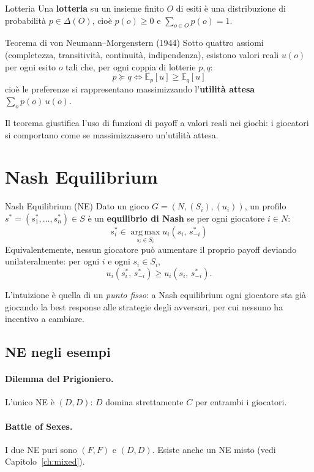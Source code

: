 \documentclass[12pt,a4paper,twoside]{book}
\theoremstyle{plain}
\theoremstyle{definition}
\newcommand{\argmax}{\operatorname*{arg\,max}}
\begin{document}
\begin{defbox}{Lotteria}
Una \textbf{lotteria} su un insieme finito $O$ di esiti è una distribuzione di probabilità $p\in\Delta(O)$, cioè $p(o)\ge 0$ e $\sum_{o\in O}p(o)=1$.
\end{defbox}

\begin{thmbox}{Teorema di von Neumann--Morgenstern (1944)}
Sotto quattro assiomi (completezza, transitività, continuità, indipendenza), esistono valori reali $u(o)$ per ogni esito $o$ tali che, per ogni coppia di lotterie $p,q$:
\[
  p \succcurlyeq q \iff \mathbb{E}_p[u] \ge \mathbb{E}_q[u]
\]
cioè le preferenze si rappresentano massimizzando l'\textbf{utilità attesa} $\sum_o p(o)\,u(o)$.
\end{thmbox}

Il teorema giustifica l'uso di funzioni di payoff a valori reali nei giochi: i giocatori si comportano come se massimizzassero un'utilità attesa.

\section{Nash Equilibrium}

\begin{defbox}{Nash Equilibrium (NE)}
Dato un gioco $G=(N,(S_i),(u_i))$, un profilo $s^* = (s^*_1,\dots,s^*_n)\in S$ è un \textbf{equilibrio di Nash} se per ogni giocatore $i\in N$:
\[
  s^*_i \in \argmax_{s_i\in S_i} u_i(s_i,\, s^*_{-i})
\]
Equivalentemente, nessun giocatore può aumentare il proprio payoff deviando unilateralmente: per ogni $i$ e ogni $s_i\in S_i$,
\[
  u_i(s^*_i,\, s^*_{-i}) \ge u_i(s_i,\, s^*_{-i}).
\]
\end{defbox}

L'intuizione è quella di un \emph{punto fisso}: a Nash equilibrium ogni giocatore sta già giocando la best response alle strategie degli avversari, per cui nessuno ha incentivo a cambiare.

\subsection{NE negli esempi}

\paragraph{Dilemma del Prigioniero.} L'unico NE è $(D,D)$: $D$ domina strettamente $C$ per entrambi i giocatori.

\paragraph{Battle of Sexes.} I due NE puri sono $(F,F)$ e $(D,D)$. Esiste anche un NE misto (vedi Capitolo~\ref{ch:mixed}).
\end{document}
